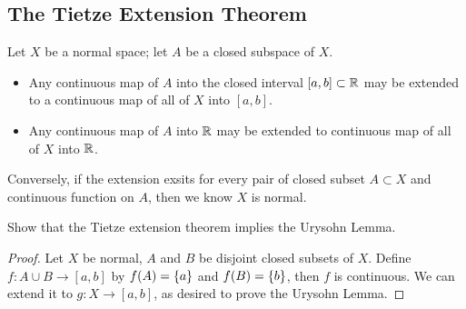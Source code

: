 \documentclass[12pt,a4paper]{article}
\begin{document}
    \subsection{The Tietze Extension Theorem}
    \begin{thm}
        Let $X$ be a normal space; let $A$ be a closed subspace of $X$.
        \begin{itemize}
            \item Any continuous map of $A$ into the closed interval $[a,b]\subset\mathbb{R}$ may be extended to a continuous map of all of $X$ into $[a,b]$.
            \item Any continuous map of $A$ into $\mathbb{R}$ may be extended to continuous map of all of $X$ into $\mathbb{R}$.
        \end{itemize}
    \end{thm}
    \begin{remark}
        Conversely, if the extension exsits for every pair of closed subset $A\subset X$ and continuous function on $A$, then we know $X$ is normal.
    \end{remark}
    \hfill
    
    \begin{ex}
        Show that the Tietze extension theorem implies the Urysohn Lemma.    
    \end{ex}
    \begin{proof}
        Let $X$ be normal, $A$ and $B$ be disjoint closed subsets of $X$. Define $f:A\cup B\to [a,b]$ by $f(A)=\left\{a\right\}$ and $f(B)=\left\{b\right\}$, then $f$ is continuous. We can extend it to $g:X\to [a,b]$, as desired to prove the Urysohn Lemma.
    \end{proof}
    \hfill
\end{document}
